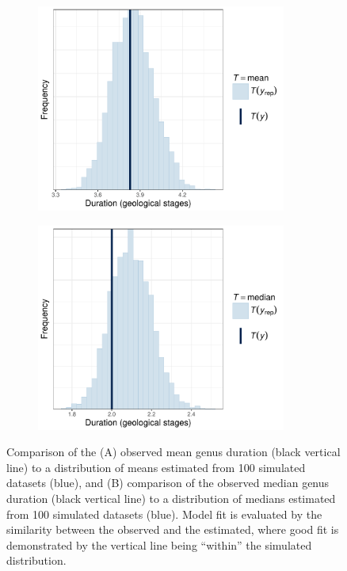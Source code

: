 \documentclass[11pt]{article}
\begin{document}
\begin{figure}[ht]
  \centering
  \begin{subfigure}{0.4\textwidth}
    \caption{}
    \includegraphics[height = 0.5\textheight,width=0.9\textwidth,keepaspectratio=true]{figure/ppc_mean_cweib_cens}
    \label{fig:ppc_mean}
  \end{subfigure}
  \begin{subfigure}{0.4\textwidth}
    \caption{}
    \includegraphics[height = 0.5\textheight,width=0.9\textwidth,keepaspectratio=true]{figure/ppc_median_cweib_cens}
    \label{fig:ppc_median}
  \end{subfigure}
  \caption{ Comparison of the (A) observed mean genus duration (black vertical line) to a distribution of means estimated from 100 simulated datasets (blue), and (B) comparison of the observed median genus duration (black vertical line) to a distribution of medians estimated from 100 simulated datasets (blue). Model fit is evaluated by the similarity between the observed and the estimated, where good fit is demonstrated by the vertical line being ``within'' the simulated distribution. }
  \label{fig:points}
\end{figure}
\end{document}
